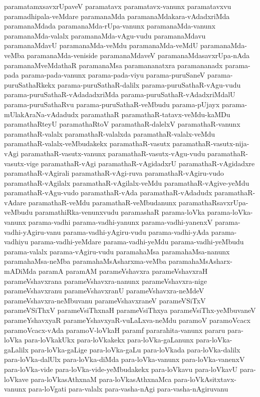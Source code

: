 {paramatamxsavxrUpaveV
paramatavx
paramatavx-vanunx
paramatavxvu
paramadhipala-veMdare
paramanaMda
paramanaMdakara-vAdadxriMda
paramanaMdada
paramanaMda-rUpa-vanunx
paramanaMda-vanunx
paramanaMda-valalx
paramanaMda-vAgu-vudu
paramanaMdavu
paramanaMdavU
paramanaMda-veMdu
paramanaMda-veMdU
paramanaMda-veMba
paramanaMda-veniside
paramanaMdaveV
paramanaMdasavxrUpa-nAda
paramanaMveMdathaR
paramanaMsa
paramananatxra
paramananadx
parama-pada
parama-pada-vanunx
parama-pada-viyu
parama-puruSaneV
parama-puruSathaRkekx
parama-puruSathaR-dalilx
parama-puruSathaR-vAgu-vudu
parama-puruSathaR-vAdadadxriMda
parama-puruSathaR-vAdadxriMdalU
parama-puruSathaRvu
parama-puruSathaR-veMbudu
parama-pUjayx
parama-mUlakAraNa-vAdadudx
paramathaR
paramathaR-tatavx-veMdu-kaMDu
paramathaRteyU
paramathaRtoV
paramathaR-dalelxV
paramathaR-vanunx
paramathaR-valalx
paramathaR-valalxda
paramathaR-valalx-veMdu
paramathaR-valalx-veMbudakekx
paramathaR-vasutx
paramathaR-vasutx-nija-vAgi
paramathaR-vasutx-vanunx
paramathaR-vasutx-vAgu-vudu
paramathaR-vasutx-vige
paramathaR-vAgi
paramathaR-vAgidadxrU
paramathaR-vAgidadxre
paramathaR-vAgirali
paramathaR-vAgi-ruva
paramathaR-vAgiru-vudo
paramathaR-vAgilalx
paramathaR-vAgilalx-veMdu
paramathaR-vAgive-yeMdu
paramathaR-vAgu-vudo
paramathaR-vAda
paramathaR-vAdadudx
paramathaR-vAdare
paramathaR-veMdu
paramathaR-veMbudanunx
paramathaRsavxrUpa-veMbudu
paramathiRka-venunxvudu
paramashaR
parama-loVka
parama-loVka-vanunx
parama-vadhi
parama-vadhi-yanunx
parama-vadhi-yanenxV
parama-vadhi-yAgiru-vanu
parama-vadhi-yAgiru-vudu
parama-vadhi-yAda
parama-vadhiyu
parama-vadhi-yeMdare
parama-vadhi-yeMdu
parama-vadhi-yeMbudu
parama-valalx
parama-vAgiru-vudu
paramahaMsa
paramahaMsa-nanunx
paramahaMsa-neMba
paramahaMsAsharxma-veMba
paramahaMsAsharx-mADiMda
paramA
paramAM
parameVshavxra
parameVshavxraH
parameVshavxrana
parameVshavxra-nanunx
parameVshavxra-nige
parameVshavxranu
parameVshavxranU
parameVshavxra-neMdeV
parameVshavxra-neMbuvanu
parameVshavxraneV
parameVSiTxV
parameVSiThxV
parameVsiThxnaH
parameVsiThxya
parameVsiThx-yeMbuvaneV
parameYshavxyaR
parameYshavxyaR-vuLaLxva-neMdu
paramoV
paramoVcacx
paramoVcacx-vAda
paramoV-loVkaH
paramf
pararahita-vanunx
pararu
para-loVka
para-loVkakUkx
para-loVkakekx
para-loVka-gaLanunx
para-loVka-gaLalilx
para-loVka-gaLige
para-loVka-gaLu
para-loVkada
para-loVka-dalilx
para-loVka-dalUlx
para-loVka-diMda
para-loVka-vanunx
para-loVka-vanenxV
para-loVka-vide
para-loVka-vide-yeMbudakekx
para-loVkavu
para-loVkavU
para-loVkave
para-loVkasAthxnaM
para-loVkasAthxnaMca
para-loVkAsitxtavx-vanunx
para-loVgati
para-valalx
para-vasha-nAgi
para-vasha-nAgiruvanu
}
